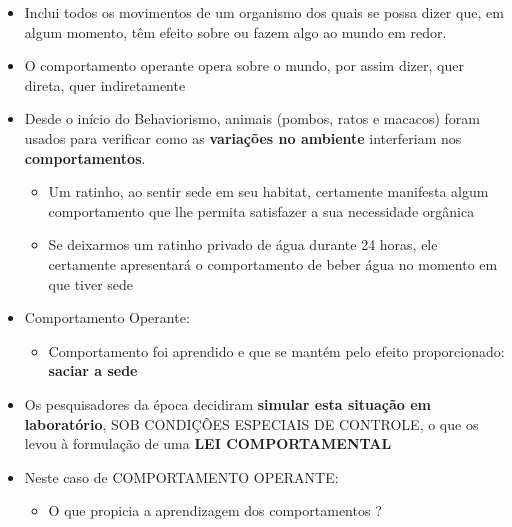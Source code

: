 \documentclass[
]{book}
\providecommand{\tightlist}{%
  \setlength{\itemsep}{0pt}\setlength{\parskip}{0pt}}
\begin{document}
\begin{itemize}
\item
  Inclui todos os movimentos de um organismo dos quais se possa dizer que, em algum momento, têm efeito sobre ou fazem algo ao mundo em redor.
\item
  O comportamento operante opera sobre o mundo, por assim dizer, quer direta, quer indiretamente
\item
  Desde o início do Behaviorismo, animais (pombos, ratos e macacos) foram usados para verificar como as \textbf{variações no ambiente} interferiam nos \textbf{comportamentos}.

  \begin{itemize}
  \tightlist
  \item
    Um ratinho, ao sentir sede em seu habitat, certamente manifesta algum comportamento que lhe permita satisfazer a sua necessidade orgânica
  \item
    Se deixarmos um ratinho privado de água durante 24 horas, ele certamente apresentará o comportamento de beber água no momento em que tiver sede
  \end{itemize}
\item
  Comportamento Operante:

  \begin{itemize}
  \tightlist
  \item
    Comportamento foi aprendido e que se mantém pelo efeito proporcionado: \textbf{saciar a sede}
  \end{itemize}
\item
  Os pesquisadores da época decidiram \textbf{simular esta situação em laboratório}, SOB CONDIÇÕES ESPECIAIS DE CONTROLE, o que os levou à formulação de uma \textbf{LEI COMPORTAMENTAL}
\item
  Neste caso de COMPORTAMENTO OPERANTE:

  \begin{itemize}
  \tightlist
  \item
    O que propicia a aprendizagem dos comportamentos ?


\end{itemize}
\end{itemize}
\end{document}
